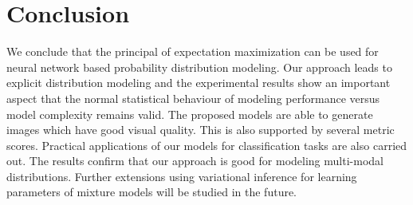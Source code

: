 \section{Conclusion}
We conclude that the principal of expectation maximization can be used for neural network based probability distribution modeling. Our approach leads to explicit distribution modeling and the experimental results show an important aspect that the normal statistical behaviour of modeling performance versus model complexity remains valid. The proposed models are able to generate images which have good visual quality. This is also supported by several metric scores. Practical applications of our models for classification tasks are also carried out. The results confirm that our approach is good for modeling multi-modal distributions.
Further extensions using variational inference for learning
parameters of mixture models will be studied in the future.


